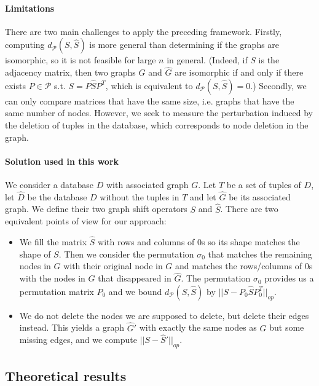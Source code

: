 \documentclass[11pt,a4paper]{article}
\newcommand{\cP}{\mathcal{P}}
\newcommand{\op}[1]{|| #1 ||_{op}}
\theoremstyle{definition}
\begin{document}
        
\paragraph{Limitations} There are two main challenges to apply the preceding framework. Firstly, computing $d_\cP(S,\hat{S})$ is more general than determining if the graphs are isomorphic, so it is not feasible for large $n$ in general. (Indeed, if $S$ is the adjacency matrix, then two graphs $G$ and $\hat{G}$ are isomorphic if and only if there exists $P \in \cP$ s.t. $S=P \hat{S} P^T$, which is equivalent to $d_\cP(S,\hat{S})=0$.) Secondly, we can only compare matrices that have the same size, i.e. graphs that have the same number of nodes. However, we seek to measure the perturbation induced by the deletion of tuples in the database, which corresponds to node deletion in the graph.

\paragraph{Solution used in this work} We consider a database $D$ with associated graph $G$. Let $T$ be a set of tuples of $D$, let $\hat{D}$ be the database $D$ without the tuples in $T$ and let $\hat{G}$ be its associated graph. We define their two graph shift operators $S$ and $\hat{S}$. There are two equivalent points of view for our approach:
      
\begin{itemize}
    \item We fill the matrix $\hat{S}$ with rows and columns of $0$s so its shape matches the shape of $S$. Then we consider the permutation $\sigma_0$ that matches the remaining nodes in $\hat{G}$ with their original node in $G$ and matches the rows/columns of $0$s with the nodes in $G$ that disappeared in $\hat{G}$. The permutation $\sigma_0$ provides us a permutation matrix $P_0$ and we bound $d_\cP(S,\hat{S})$ by $||S-P_0 \hat{S} P_0^T||_{op}$.

    \item We do not delete the nodes we are supposed to delete, but delete their edges instead. This yields a graph $\hat{G}'$ with exactly the same nodes as $G$ but some missing edges, and we compute $\op{S-\hat{S}'}$.
\end{itemize}

\subsection{Theoretical results}
\end{document}
